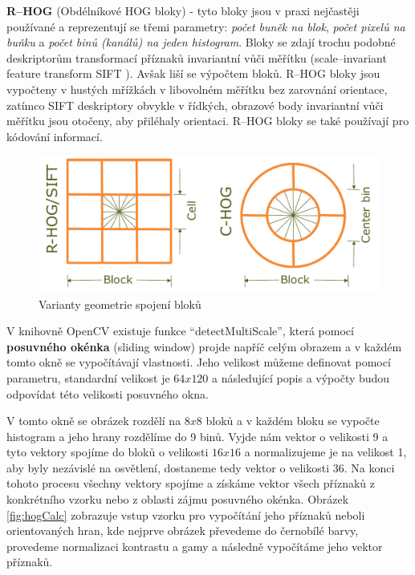 \textbf{R--HOG} (Obdélníkové HOG bloky) - tyto bloky jsou v praxi nejčastěji používané a reprezentují se třemi parametry: \textit{počet buněk na blok}, \textit{počet pixelů na buňku} a \textit{počet binů (kanálů) na jeden histogram}. Bloky se zdají trochu podobné deskriptorům transformací příznaků invariantní vůči měřítku (scale--invariant feature transform SIFT \cite{siftPaper}). Avšak liší se výpočtem bloků. R--HOG bloky jsou vypočteny v hustých mřížkách v libovolném měřítku bez zarovnání orientace, zatímco SIFT deskriptory obvykle v řídkých, obrazové body invariantní vůči měřítku jsou otočeny, aby přiléhaly orientaci. R--HOG bloky se také používají pro kódování informací. 
\begin{figure}[H]
  \centering
  \includegraphics[width=14cm]{figures/hog_variants.pdf}
  \caption{Varianty geometrie spojení bloků \cite{hog:dalal}}
  \label{variants_block}
\end{figure}
V knihovně OpenCV existuje funkce ``detectMultiScale'', která pomocí \textbf{posuvného okénka} (sliding window) projde napříč celým obrazem a v každém tomto okně se vypočítávají vlastnosti. Jeho velikost můžeme definovat pomocí parametru, standardní velikost je $64x120$ a následující popis a výpočty budou odpovídat této velikosti posuvného okna.  

V tomto okně se obrázek rozdělí na $8x8$ bloků a v každém bloku se vypočte histogram a jeho hrany rozdělíme do 9 binů. Vyjde nám vektor o velikosti 9 a tyto vektory spojíme do bloků o velikosti $16x16$ a normalizujeme je na velikost 1, aby byly nezávislé na osvětlení, dostaneme tedy vektor o velikosti 36. Na konci tohoto procesu všechny vektory spojíme a získáme vektor všech příznaků z konkrétního vzorku nebo z oblasti zájmu posuvného okénka. Obrázek \ref{fig:hogCalc} zobrazuje vstup vzorku pro vypočítání jeho příznaků neboli orientovaných hran, kde nejprve obrázek převedeme do černobílé barvy, provedeme normalizaci kontrastu a gamy a následně vypočítáme jeho vektor příznaků.


